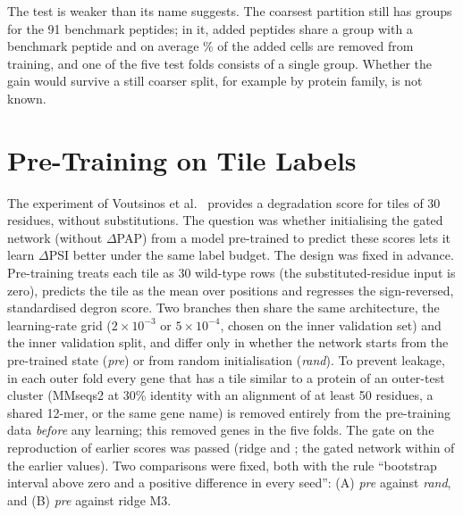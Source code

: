 The test is weaker than its name suggests. The coarsest partition still has \nRcCoarseGroups{} groups for the 91 benchmark peptides; in
it, \nRcCoarseShared{} added peptides share a group with a benchmark peptide and on average \nRcCoarseExcl\% of the added cells are removed
from training, and one of the five test folds consists of a single group. Whether the gain would survive a still coarser
split, for example by protein family, is not known.


\section{Pre-Training on Tile Labels}\label{sec:res-pretrain}
The experiment of Voutsinos et al.\ \citep{voutsinos2026} provides a degradation score for \nPtNTiles{} tiles of 30 residues,
without substitutions. The question was whether initialising the gated network (without $\Delta$PAP) from a model
pre-trained to predict these scores lets it learn $\Delta$PSI better under the same label budget. The design was fixed in
advance. Pre-training treats each tile as 30 wild-type rows (the substituted-residue input is zero), predicts the tile
as the mean over positions and regresses the sign-reversed, standardised degron score. Two branches then share the same
architecture, the learning-rate grid ($2\times10^{-3}$ or $5\times10^{-4}$, chosen on the inner validation set) and the
inner validation split, and differ only in whether the network starts from the pre-trained state (\emph{pre}) or from
random initialisation (\emph{rand}). To prevent leakage, in each outer fold every gene that has a tile similar to a protein of
an outer-test cluster (MMseqs2 at 30\% identity with an alignment of at least 50 residues, a shared 12-mer, or the same gene
name) is removed entirely from the pre-training data \emph{before} any learning; this removed \nPtGenesExcl{} genes in the five folds.
The gate on the reproduction of earlier scores was passed (ridge \nAucRidge{} and \nAucRidgeExt; the gated network within \nPtGateGap{}
of the earlier values). Two comparisons were fixed, both with the rule ``bootstrap interval above zero and a positive
difference in every seed'': (A) \emph{pre} against \emph{rand}, and (B) \emph{pre} against ridge M3.

